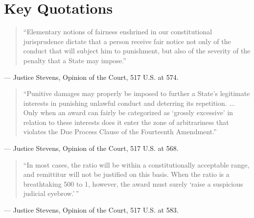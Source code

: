 \documentclass[12pt]{article}
\begin{document}
\section{Key Quotations}

\begin{quote}
``Elementary notions of fairness enshrined in our constitutional jurisprudence dictate that a person receive fair notice not only of the conduct that will subject him to punishment, but also of the severity of the penalty that a State may impose.''
\end{quote}
\noindent --- Justice Stevens, Opinion of the Court, 517 U.S. at 574.

\begin{quote}
``Punitive damages may properly be imposed to further a State's legitimate interests in punishing unlawful conduct and deterring its repetition. ... Only when an award can fairly be categorized as `grossly excessive' in relation to these interests does it enter the zone of arbitrariness that violates the Due Process Clause of the Fourteenth Amendment.''
\end{quote}
\noindent --- Justice Stevens, Opinion of the Court, 517 U.S. at 568.

\begin{quote}
``In most cases, the ratio will be within a constitutionally acceptable range, and remittitur will not be justified on this basis. When the ratio is a breathtaking 500 to 1, however, the award must surely `raise a suspicious judicial eyebrow.'\,''
\end{quote}
\noindent --- Justice Stevens, Opinion of the Court, 517 U.S. at 583.
\end{document}
